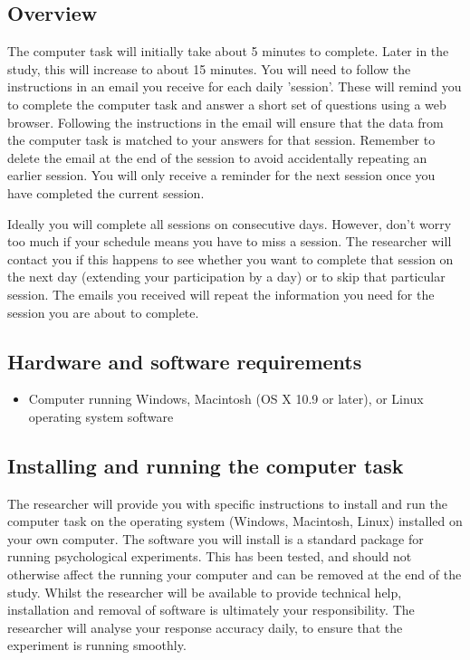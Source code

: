 \subsection{Overview}

The computer task will initially take about 5 minutes to complete. Later
in the study, this will increase to about 15 minutes. You will need
to follow the instructions in an email you receive for each daily
'session'. These will remind you to complete the computer task and
answer a short set of questions using a web browser. Following the
instructions in the email will ensure that the data from the computer
task is matched to your answers for that session.  Remember to delete
the email at the end of the session to avoid accidentally repeating an
earlier session. You will only receive a reminder for the next session
once you have completed the current session.

Ideally you will complete all sessions on consecutive days. However, don't
worry too much if your schedule means you have to miss a session. The
researcher will contact you if this happens to see whether you want to
complete that session on the next day (extending your participation by
a day) or to skip that particular session. The emails you received will
repeat the information you need for the session you are about to complete.

\subsection{Hardware and software requirements}
\begin{itemize}
\item Computer running Windows, Macintosh (OS X 10.9 or later), or Linux operating system software
\end{itemize}

\subsection[Installing and running the computer task]{Installing and running the computer task}

The researcher will provide you with specific instructions to install
and run the computer task on the operating system (Windows, Macintosh,
Linux) installed on your own computer. The software you will install
is a standard package for running psychological experiments. This has
been tested, and should not otherwise affect the running your computer
and can be removed at the end of the study. Whilst the researcher will
be available to provide technical help, installation and removal of
software is ultimately your responsibility. The researcher will analyse
your response accuracy daily, to ensure that the experiment is running
smoothly.

